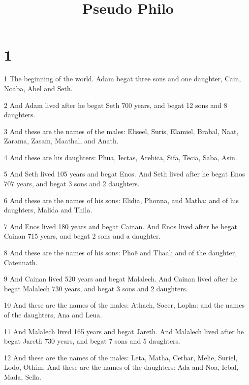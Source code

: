 

\title{Pseudo Philo}

\chapter{1}

\par 1 The beginning of the world. Adam begat three sons and one daughter, Cain, Noaba, Abel and Seth.

\par 2 And Adam lived after he begat Seth 700 years, and begat 12 sons and 8 daughters.

\par 3 And these are the names of the males: Eliseel, Suris, Elamiel, Brabal, Naat, Zarama, Zasam, Maathal, and Anath.

\par 4 And these are his daughters: Phua, Iectas, Arebica, Sifa, Tecia, Saba, Asin.

\par 5 And Seth lived 105 years and begat Enos. And Seth lived after he begat Enos 707 years, and begat 3 sons and 2 daughters.

\par 6 And these are the names of his sons: Elidia, Phonna, and Matha: and of his daughters, Malida and Thila.

\par 7 And Enos lived 180 years and begat Cainan. And Enos lived after he begat Cainan 715 years, and begat 2 sons and a daughter.

\par 8 And these are the names of his sons: Phoë and Thaal; and of the daughter, Catennath.

\par 9 And Cainan lived 520 years and begat Malalech. And Cainan lived after he begat Malalech 730 years, and begat 3 sons and 2 daughters.

\par 10 And these are the names of the males: Athach, Socer, Lopha: and the names of the daughters, Ana and Leua.

\par 11 And Malalech lived 165 years and begat Jareth. And Malalech lived after he begat Jareth 730 years, and begat 7 sons and 5 daughters.

\par 12 And these are the names of the males: Leta, Matha, Cethar, Melie, Suriel, Lodo, Othim. And these are the names of the daughters: Ada and Noa, Iebal, Mada, Sella.

